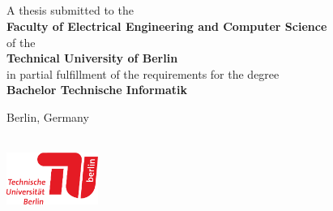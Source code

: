 \thispagestyle{empty}
\rule{0cm}{2cm}

\fontsize{19.83}{26.45} \selectfont 
\noindent \textbf{\titleLineOne} \vspace{0.2cm}
\\\textbf{\titleLineTwo}\vspace{0.2cm}
\\\textbf{\titleLineThree}
\normalsize



\newpage
\thispagestyle{empty}
\rule{0cm}{2cm}
\newpage

\thispagestyle{empty}
\rule{0cm}{1.5cm}

\fontsize{24.44}{32} \selectfont 
\noindent \textbf{\titleLineOne} \vspace{0.2cm}
\\\textbf{\titleLineTwo}\vspace{0.2cm}
\\\textbf{\titleLineThree}
\normalsize



\vspace{1.5cm}
 
\noindent \textbf{\studentname}

\vspace{-0.25cm}
\vspace{7cm}

\noindent A thesis submitted to the 
\\\textbf{Faculty of Electrical Engineering and Computer Science
} 
\\of the 
\\\textbf{Technical University of Berlin} 
\\in partial fulfillment of the requirements for the degree 
\\\textbf{Bachelor Technische Informatik}

\vspace{-0.5cm}
 
\noindent Berlin, Germany\\ 
\documentdate\\

\vspace{-0.83cm}

\noindent \includegraphics[width=30mm,angle=0]{graphics/tu_logo}

